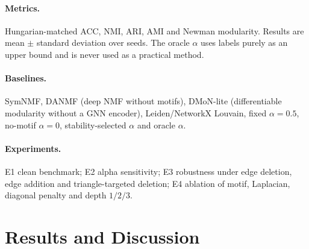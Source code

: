 \documentclass[11pt,a4paper]{article}
\begin{document}
\paragraph{Metrics.} Hungarian-matched ACC, NMI, ARI, AMI and Newman modularity. Results are
mean $\pm$ standard deviation over seeds. The oracle $\alpha$ uses labels purely as an upper
bound and is never used as a practical method.

\paragraph{Baselines.} SymNMF, DANMF (deep NMF without motifs), DMoN-lite (differentiable
modularity without a GNN encoder), Leiden/NetworkX Louvain, fixed $\alpha=0.5$, no-motif
$\alpha=0$, stability-selected $\alpha$ and oracle $\alpha$.

\paragraph{Experiments.} E1 clean benchmark; E2 alpha sensitivity; E3 robustness under edge
deletion, edge addition and triangle-targeted deletion; E4 ablation of motif, Laplacian,
diagonal penalty and depth $1/2/3$.

\section{Results and Discussion}
\end{document}
